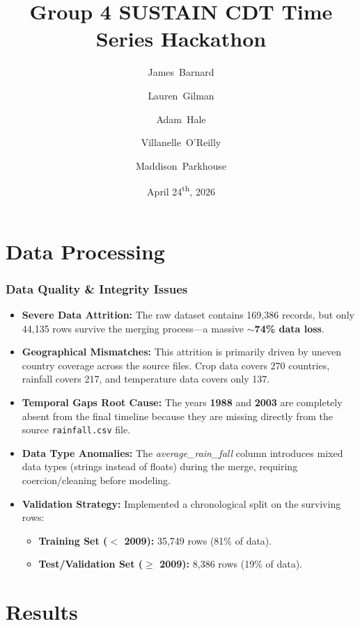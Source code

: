 \documentclass[aspectratio=169]{beamer}
\title{Group 4 SUSTAIN CDT Time Series Hackathon}
\author{James~Barnard \and Lauren~Gilman \and Adam~Hale \and Villanelle~O'Reilly \and Maddison~Parkhouse}
\institute{Authors listed in order of last name.}
\date{April 24\textsuperscript{th}, 2026}
\begin{document}
\frame{\titlepage}

    \section{Data Processing}

    \begin{frame}
        \frametitle{Data Quality \& Integrity Issues}
        \begin{itemize}
            \item \textbf{Severe Data Attrition:} The raw dataset contains 169,386 records, but only 44,135 rows survive the merging process---a massive \textbf{$\sim$74\% data loss}.
            \item \textbf{Geographical Mismatches:} This attrition is primarily driven by uneven country coverage across the source files. Crop data covers 270 countries, rainfall covers 217, and temperature data covers only 137. 
            \item \textbf{Temporal Gaps Root Cause:} The years \textbf{1988} and \textbf{2003} are completely absent from the final timeline because they are missing directly from the source \texttt{rainfall.csv} file.
            \item \textbf{Data Type Anomalies:} The \textit{average\_rain\_fall} column introduces mixed data types (strings instead of floats) during the merge, requiring coercion/cleaning before modeling.
            \item \textbf{Validation Strategy:} Implemented a chronological split on the surviving rows:
            \begin{itemize}
                \item \textbf{Training Set ($<$ 2009):} 35,749 rows (81\% of data).
                \item \textbf{Test/Validation Set ($\ge$ 2009):} 8,386 rows (19\% of data).
            \end{itemize}
        \end{itemize}
    \end{frame}

    \section{Results}
\end{document}
